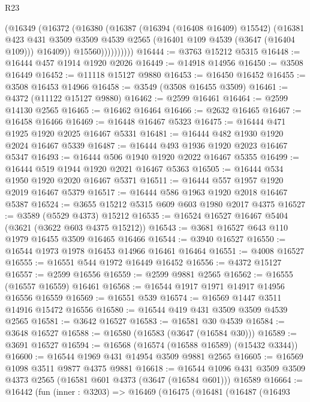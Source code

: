 \begin{lexlean}{R23}
\begin{coremodule}
                  (@16349
                    (@16372
                      (@16380
                        (@16387
                          (@16394 (@16408 @16409) @15542)
                          (@16381
                            @423
                            @431
                            @3509
                            @3509
                            @4539
                            @2565
                            (@16401 @109 @4539 (@3647 (@16404 @109)))
                            @16409))
                        @15560))))))))))
@16444 := @3763 @15212 @5315
@16448 := @16444 @457 @1914 @1920 @2026
@16449 := @14918 @14956
@16450 := @3508 @16449
@16452 := @11118 @15127 @9880
@16453 := @16450 @16452
@16455 := @3508 @16453 @14966
@16458 := @3549 (@3508 @16455 @3509)
@16461 := @4372 (@11122 @15127 @9880)
@16462 := @2599 @16461
@16464 := @2599 @14130 @2565
@16465 := @16462 @16464
@16466 := @2632 @16465
@16467 := @16458 @16466
@16469 := @16448 @16467 @5323
@16475 := @16444 @471 @1925 @1920 @2025 @16467 @5331
@16481 := @16444 @482 @1930 @1920 @2024 @16467 @5339
@16487 := @16444 @493 @1936 @1920 @2023 @16467 @5347
@16493 := @16444 @506 @1940 @1920 @2022 @16467 @5355
@16499 := @16444 @519 @1944 @1920 @2021 @16467 @5363
@16505 := @16444 @534 @1950 @1920 @2020 @16467 @5371
@16511 := @16444 @557 @1957 @1920 @2019 @16467 @5379
@16517 := @16444 @586 @1963 @1920 @2018 @16467 @5387
@16524 := @3655 @15212 @5315 @609 @603 @1980 @2017 @4375
@16527 := @3589 (@5529 @4373) @15212
@16535 := @16524 @16527 @16467 @5404 (@3621 (@3622 @603 @4375 @15212))
@16543 := @3681 @16527 @643 @110 @1979 @16455 @3509 @16465 @16466
@16544 := @3940 @16527
@16550 := @16544 @1973 @1978 @16453 @14966 @16461 @16464
@16551 := @4008 @16527
@16555 := @16551 @544 @1972 @16449 @16452
@16556 := @4372 @15127
@16557 := @2599 @16556
@16559 := @2599 @9881 @2565
@16562 := @16555 (@16557 @16559) @16461
@16568 := @16544 @1917 @1971 @14917 @14956 @16556 @16559
@16569 := @16551 @539
@16574 := @16569 @1447 @3511 @14916 @15472 @16556
@16580 := @16544 @419 @431 @3509 @3509 @4539 @2565
@16581 := @3642 @16527
@16583 := @16581 @30 @4539
@16584 := @3648 @16527
@16588 := @16580 (@16583 (@3647 (@16584 @30)))
@16589 := @3691 @16527
@16594 := @16568 (@16574 (@16588 @16589) (@15432 @3344))
@16600 := @16544 @1969 @431 @14954 @3509 @9881 @2565
@16605 := @16569 @1098 @3511 @9877 @4375 @9881
@16618 := @16544 @1096 @431 @3509 @3509 @4373 @2565 (@16581 @601 @4373 (@3647 (@16584 @601))) @16589
@16664 := @16442
    (fun (inner : @3203) =>
    @16469
      (@16475
        (@16481
          (@16487
            (@16493

\end{coremodule}
\end{lexlean}
